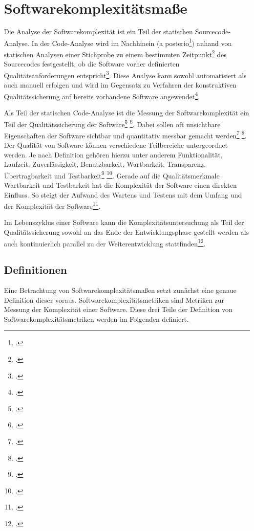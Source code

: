 \chapter{Softwarekomplexitätsmaße}\label{softwarekomplexituxe4tsmauxdfe}

Die Analyse der Softwarekomplexität ist ein Teil der statischen
Sourcecode-Analyse. In der Code-Analyse wird im Nachhinein (a
posterio\footcite[Vgl. ][]{Hoffmann, D. W. 2013, S. 261}) anhand von statischen
Analysen einer Stichprobe zu einem bestimmten Zeitpunkt\footcite[Vgl. ][]{(Ebert
  1996: 86)} des Sourcecodes festgestellt, ob die Software vorher
definierten Qualitätsanforderungen entspricht\footcite[Vgl. ][]{Ebenda, S. 261}.
Diese Analyse kann sowohl automatisiert als auch manuell erfolgen und
wird im Gegensatz zu Verfahren der konstruktiven Qualitätssicherung auf
bereits vorhandene Software angewendet\footcite[Vgl. ][]{(Hoffmann 2013:261)}.

Als Teil der statischen Code-Analyse ist die Messung der
Softwarekomplexität ein Teil der Qualitätssicherung der
Software\footcite[Vgl. ][]{Quelle fehlt} \footcite[Vgl. ][]{Hoffmann 2013:261}. Dabei
sollen oft unsichtbare Eigenschaften der Software sichtbar und
quantitativ messbar gemacht werden\footcite[Vgl. ][]{Hoffmann 2013:261}
\footcite[Vgl. ][]{Zuse, 1991, p. S. 561)}. Der Qualität von Software können
verschiedene Teilbereiche untergeordnet werden. Je nach Definition
gehören hierzu unter anderem Funktionalität, Laufzeit, Zuverlässigkeit,
Benutzbarkeit, Wartbarkeit, Transparenz, Übertragbarkeit und
Testbarkeit\footcite[Vgl. ][]{Hoffmann, D. W. 2013, S. 22f} \footcite[Vgl. ][]{Liggesmeyer
  2009:245}. Gerade auf die Qualitätsmerkmale Wartbarkeit und
Testbarkeit hat die Komplexität der Software einen direkten Einfluss. So
steigt der Aufwand des Wartens und Testens mit dem Umfang und der
Komplexität der Software\footcite[Vgl. ][]{Quelle fehlt}.

Im Lebenszyklus einer Software kann die Komplexitätsuntersuchung als
Teil der Qualitätssicherung sowohl an das Ende der Entwicklungsphase
gestellt werden als auch kontinuierlich parallel zu der
Weiterentwicklung stattfinden\footcite[Vgl. ][]{Quelle fehlt}.

\section{Definitionen}\label{definitionen}

Eine Betrachtung von Softwarekomplexitätsmaßen setzt zunächst eine
genaue Definition dieser voraus. Softwarekomplexitätsmetriken sind
Metriken zur Messung der Komplexität einer Software. Diese drei Teile
der Definition von Softwarekomplexitätsmetriken werden im Folgenden
definiert.

